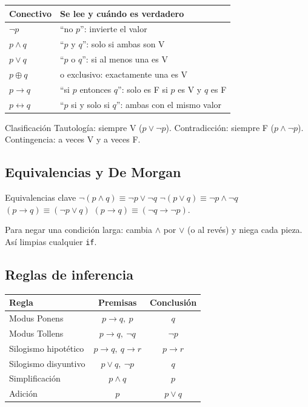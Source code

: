 \begin{center}
\begin{tabular}{|p{3.6cm}|p{9cm}|}
\hline
\rowcolor{tmAzulClaro}\textbf{Conectivo} & \textbf{Se lee y cu\'ando es verdadero}\\ \hline
$\neg p$ & ``no $p$'': invierte el valor\\ \hline
$p\wedge q$ & ``$p$ y $q$'': solo si ambas son V\\ \hline
$p\vee q$ & ``$p$ o $q$'': si al menos una es V\\ \hline
$p\oplus q$ & o exclusivo: exactamente una es V\\ \hline
$p\to q$ & ``si $p$ entonces $q$'': solo es F si $p$ es V y $q$ es F\\ \hline
$p\leftrightarrow q$ & ``$p$ si y solo si $q$'': ambas con el mismo valor\\ \hline
\end{tabular}
\end{center}

\begin{tmdef}{Clasificaci\'on}
Tautolog\'ia: siempre V ($p\vee\neg p$). Contradicci\'on: siempre F ($p\wedge\neg p$). Contingencia: a veces V y a veces F.
\end{tmdef}

\subsection{Equivalencias y De Morgan}
\begin{tmdef}{Equivalencias clave}
$\neg(p\wedge q)\equiv\neg p\vee\neg q$ \quad $\neg(p\vee q)\equiv\neg p\wedge\neg q$ \quad $(p\to q)\equiv(\neg p\vee q)$ \quad $(p\to q)\equiv(\neg q\to\neg p)$.
\end{tmdef}

\begin{tmtip}Para negar una condici\'on larga: cambia $\wedge$ por $\vee$ (o al rev\'es) y niega cada pieza. As\'i limpias cualquier \texttt{if}.\end{tmtip}

\subsection{Reglas de inferencia}
\begin{center}
\begin{tabular}{|l|c|c|}
\hline
\rowcolor{tmAzulClaro}\textbf{Regla} & \textbf{Premisas} & \textbf{Conclusi\'on}\\ \hline
Modus Ponens & $p\to q,\ p$ & $q$\\ \hline
Modus Tollens & $p\to q,\ \neg q$ & $\neg p$\\ \hline
Silogismo hipot\'etico & $p\to q,\ q\to r$ & $p\to r$\\ \hline
Silogismo disyuntivo & $p\vee q,\ \neg p$ & $q$\\ \hline
Simplificaci\'on & $p\wedge q$ & $p$\\ \hline
Adici\'on & $p$ & $p\vee q$\\ \hline
\end{tabular}
\end{center}

